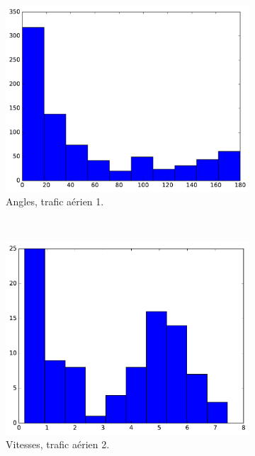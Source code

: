 \begin{figure}[!htbp]
\begin{subfigure}[t]{\subImgWclicks}
			\centering
			\includegraphics[width=\textwidth]{figures/ch3/mhA_angle}
			\caption{Angles, trafic aérien 1.}
			\label{fig:mhA_angle}
		\end{subfigure}
		~
		\begin{subfigure}[t]{\subImgWclicks}
			\centering
			\includegraphics[width=\textwidth]{figures/ch3/germanwingsA_filteredSpeed}
			\caption{Vitesses, trafic aérien 2.}
			\label{fig:germanwingsA_filteredSpeed}
		\end{subfigure}
		~
		\begin{subfigure}[t]{\subImgWclicks}
			\centering

\end{subfigure}
\end{figure}
